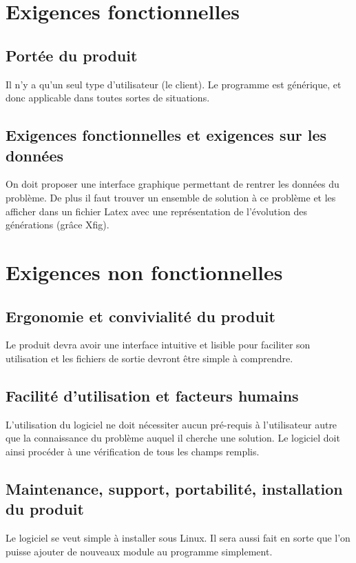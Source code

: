 \documentclass[a4paper,11pt]{article}
\begin{document}
	\section{Exigences fonctionnelles}
		\subsection{Portée du produit}
			Il n’y a qu’un seul type d’utilisateur (le client). Le programme est générique, et donc applicable dans toutes sortes de situations.
		\subsection{Exigences fonctionnelles et exigences sur les données}
			On doit proposer une interface graphique permettant de rentrer les données du problème. De plus il faut trouver un ensemble de solution à ce problème et les afficher dans un fichier Latex avec une représentation de l’évolution des générations (grâce Xfig). 
			
	\section{Exigences non fonctionnelles}
		\subsection{Ergonomie et convivialité du produit}
			Le produit devra avoir une interface intuitive et lisible pour faciliter son utilisation et les fichiers de sortie devront être simple à comprendre.
		
		\subsection{Facilité d’utilisation et facteurs humains}
			L’utilisation du logiciel ne doit nécessiter aucun pré-requis à l’utilisateur autre que la connaissance du problème auquel il cherche une solution. 
			Le logiciel doit ainsi procéder à une vérification de tous les champs remplis.
		
		\subsection{Maintenance, support, portabilité, installation du produit}
			Le logiciel se veut simple à installer sous Linux. Il sera aussi fait en sorte que l'on puisse ajouter de nouveaux module au programme simplement.  
			
\end{document}
